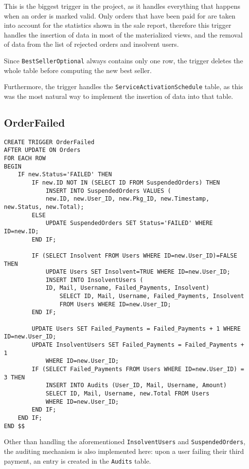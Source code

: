 This is the biggest trigger in the project, as it handles everything that happens when an order is marked valid. Only orders that have been paid for are taken into account for the statistics shown in the sale report, therefore this trigger handles the insertion of data in most of the materialized views, and the removal of data from the list of rejected orders and insolvent users.

Since \texttt{BestSellerOptional} always contains only one row, the trigger deletes the whole table before computing the new best seller.

Furthermore, the trigger handles the \texttt{ServiceActivationSchedule} table, as this was the most natural way to implement the insertion of data into that table.

\subsection{OrderFailed}

\begin{lstlisting}[style=SQL]
CREATE TRIGGER OrderFailed
AFTER UPDATE ON Orders
FOR EACH ROW
BEGIN
    IF new.Status='FAILED' THEN
        IF new.ID NOT IN (SELECT ID FROM SuspendedOrders) THEN
            INSERT INTO SuspendedOrders VALUES (
            new.ID, new.User_ID, new.Pkg_ID, new.Timestamp, new.Status, new.Total);
        ELSE
            UPDATE SuspendedOrders SET Status='FAILED' WHERE ID=new.ID;
        END IF;

        IF (SELECT Insolvent FROM Users WHERE ID=new.User_ID)=FALSE THEN
            UPDATE Users SET Insolvent=TRUE WHERE ID=new.User_ID;
            INSERT INTO InsolventUsers (
            ID, Mail, Username, Failed_Payments, Insolvent)
                SELECT ID, Mail, Username, Failed_Payments, Insolvent
                FROM Users WHERE ID=new.User_ID;
        END IF;

        UPDATE Users SET Failed_Payments = Failed_Payments + 1 WHERE ID=new.User_ID;
        UPDATE InsolventUsers SET Failed_Payments = Failed_Payments + 1
            WHERE ID=new.User_ID;
        IF (SELECT Failed_Payments FROM Users WHERE ID=new.User_ID) = 3 THEN
            INSERT INTO Audits (User_ID, Mail, Username, Amount)
            SELECT ID, Mail, Username, new.Total FROM Users
            WHERE ID=new.User_ID;
        END IF;
    END IF;
END $$
\end{lstlisting}

Other than handling the aforementioned \texttt{InsolventUsers} and \texttt{SuspendedOrders}, the auditing mechanism is also implemented here: upon a user failing their third payment, an entry is created in the \texttt{Audits} table.

